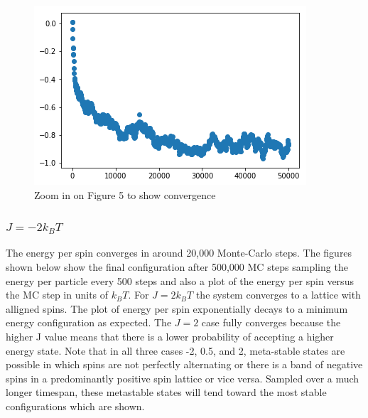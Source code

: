 \documentclass{article}
\begin{document}
	\begin{figure}[H]
		\centering
		\includegraphics[scale=0.75]{J=05d}
		\caption{Zoom in on Figure 5 to show convergence}
	\end{figure}

	\subsubsection*{$J = -2k_BT$}

	The energy per spin converges in around 20,000 Monte-Carlo steps. The figures shown below show the final configuration after 500,000 MC steps sampling the energy per particle every 500 steps and also a plot of the energy per spin versus the MC step in units of $k_BT$. For $J=2k_BT$ the system converges to a lattice with alligned spins. The plot of energy per spin exponentially decays to a minimum energy configuration as expected. The $J=2$ case fully converges because the higher J value means that there is a lower probability of accepting a higher energy state. Note that in all three cases -2, 0.5, and 2, meta-stable states are possible in which spins are not perfectly alternating or there is a band of negative spins in a predominantly positive spin lattice or vice versa. Sampled over a much longer timespan, these metastable states will tend toward the most stable configurations which are shown.
\end{document}
